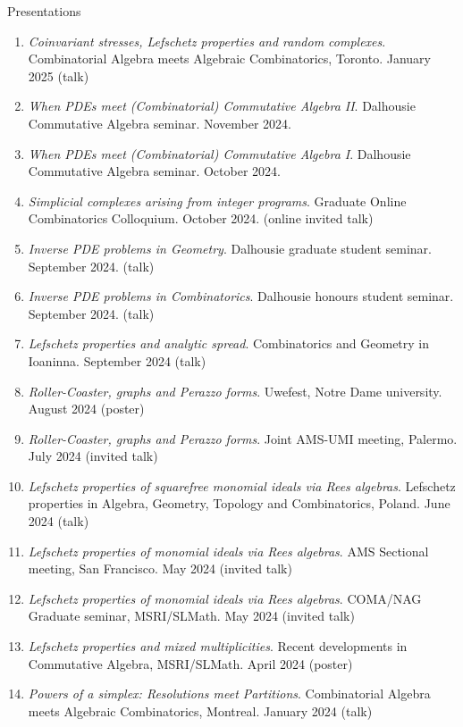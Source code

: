 \documentclass[12pt]{resume} %
\begin{document}
\begin{rSection}{Presentations}
    \begin{enumerate}
        \item \textit{Coinvariant stresses, Lefschetz properties and random complexes}. Combinatorial Algebra meets Algebraic Combinatorics, Toronto. January 2025 (talk)
        \item \textit{When PDEs meet (Combinatorial) Commutative Algebra II}. Dalhousie Commutative Algebra seminar. November 2024.
        \item \textit{When PDEs meet (Combinatorial) Commutative Algebra I}. Dalhousie Commutative Algebra seminar. October 2024.
        \item \textit{Simplicial complexes arising from integer programs}. Graduate Online Combinatorics Colloquium. October 2024. (online invited talk)
        \item \textit{Inverse PDE problems in Geometry}. Dalhousie graduate student seminar. September 2024. (talk)
        \item \textit{Inverse PDE problems in Combinatorics}. Dalhousie honours student seminar. September 2024. (talk)
        \item \textit{Lefschetz properties and analytic spread}. Combinatorics and Geometry in Ioaninna. September 2024 (talk)
        \item \textit{Roller-Coaster, graphs and Perazzo forms}. Uwefest, Notre Dame university. August 2024 (poster)
        \item \textit{Roller-Coaster, graphs and Perazzo forms}. Joint AMS-UMI meeting, Palermo. July 2024 (invited talk)
        \item \textit{Lefschetz properties of squarefree monomial ideals via Rees algebras}. Lefschetz properties in Algebra, Geometry, Topology and Combinatorics, Poland. June 2024 (talk) 
        \item \textit{Lefschetz properties of monomial ideals via Rees algebras}. AMS Sectional meeting, San Francisco. May 2024 (invited talk) 
        \item \textit{Lefschetz properties of monomial ideals via Rees algebras}. COMA/NAG Graduate seminar, \newline MSRI/SLMath. May 2024 (invited talk) 
        \item \textit{Lefschetz properties and mixed multiplicities}. Recent developments in Commutative Algebra, MSRI/SLMath. April 2024 (poster)
        \item \textit{Powers of a simplex: Resolutions meet Partitions}. Combinatorial Algebra meets Algebraic Combinatorics, Montreal. January 2024 (talk)

\end{enumerate}
\end{rSection}
\end{document}
